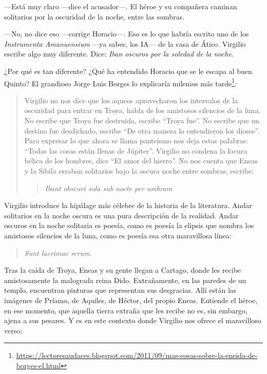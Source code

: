 \documentclass[11pt,a4paper]{article}
\begin{document}
---Está muy claro ---dice el acusador---. El héroe y su compañera caminan solitarios por la oscuridad de la noche, entre las sombras.

---No, no dice eso ---corrige Horacio---. Eso es lo que habría escrito uno de los \emph{Instrumenta Amanuensium} ---ya sabes, los IA--- de la casa de Ático. Virgilio escribe algo muy diferente. Dice: \emph{Iban oscuros por la soledad de la noche}.

¿Por qué es tan diferente? ¿Qué ha entendido Horacio que se le escapa al buen Quinto? El grandioso Jorge Luis Borges lo explicaría milenios más tarde\footnote{\url{https://lectoresaudaces.blogspot.com/2011/09/mas-cosas-sobre-la-eneida-de-borges-el.html}}:

\begin{quotation}
Virgilio no nos dice que los aqueos aprovecharon los intervalos de la oscuridad para entrar en Troya, habla de los amistosos silencios de la luna. No escribe que Troya fue destruida, escribe “Troya fue”. No escribe que un destino fue desdichado, escribe “De otra manera lo entendieron los dioses”. Para expresar lo que ahora se llama panteísmo nos deja estas palabras: “Todas las cosas están llenas de Júpiter”. Virgilio no condena la locura bélica de los hombres, dice “El amor del hierro”. No nos cuenta que Eneas y la Sibila erraban solitarios bajo la oscura noche entre sombras, escribe:

\begin{verse}
\emph{Ibant obscuri sola sub nocte per umbram}
\end{verse}
\end{quotation}

Virgilio introduce la hipálage más célebre de la historia de la literatura. Andar solitarios en la noche oscura es una pura descripción de la realidad. Andar oscuros en la noche solitaria es poesía, como es poesía la elipsis que nombra los amistosos silencios de la luna, como es poesía esa otra maravillosa línea:

\begin{verse}
\emph{Sunt lacrimae rerum}.
\end{verse}

Tras la caída de Troya, Eneas y su gente llegan a Cartago, donde les recibe amistosamente la malograda reina Dido. Extrañamente, en las paredes de un templo, encuentran pinturas que representan sus desgracias. Allí están las imágenes de Príamo, de Aquiles, de Héctor, del propio Eneas. Entiende el héroe, en ese momento, que aquella tierra extraña que les recibe no es, sin embargo, ajena a sus pesares. Y es en este contexto donde Virgilio nos ofrece el maravilloso verso:
\end{document}
